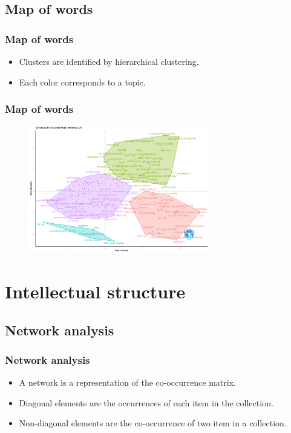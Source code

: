 \documentclass[aspectratio=169]{beamer}
\begin{document}
\subsection{Map of words}

\begin{frame}
	\frametitle{Map of words}
	\begin{itemize}
		\item Clusters are identified by hierarchical clustering.
		\item Each color corresponds to a topic.
	\end{itemize}
\end{frame}

\begin{frame}
	\frametitle{Map of words}
	\begin{figure}
		\centering
		\includegraphics[width=0.7\textwidth]{figures/con_stru_map.png}
	\end{figure}
\end{frame}



\section{Intellectual structure}



\subsection{Network analysis}

\begin{frame}
	\frametitle{Network analysis}
	\begin{itemize}
		\item A network is a representation of the co-occurrence matrix.
		\item Diagonal elements are the occurrences of each item in the collection.
		\item Non-diagonal elements are the co-occurrence of two item in a
		      collection.
	\end{itemize}
\end{frame}
\end{document}
